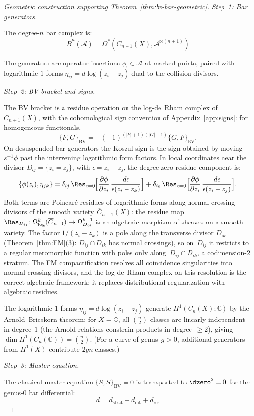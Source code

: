 \begin{proof}[Geometric construction supporting \textup{Theorem~\ref{thm:bv-bar-geometric}}]
\emph{Step~1: Bar generators.}

The degree-$n$ bar complex is:
\[\bar{B}^n(\mathcal{A}) = \Omega^*(\overline{C}_{n+1}(X), \mathcal{A}^{\boxtimes (n+1)})\]

The generators are operator insertions $\phi_i \in \mathcal{A}$ at marked points, paired with logarithmic $1$-forms $\eta_{ij} = d\log(z_i - z_j)$ dual to the collision divisors.

\emph{Step~2: BV bracket and signs.}

The BV bracket is a residue operation on the log-de~Rham complex
of~$\overline{C}_{n+1}(X)$, with the cohomological sign convention
of Appendix~\ref{app:signs}: for homogeneous functionals,
\[
\{F,G\}_{\mathrm{BV}}
=-(-1)^{(|F|+1)(|G|+1)}\{G,F\}_{\mathrm{BV}}.
\]
On desuspended bar generators the Koszul sign is the sign obtained by
moving $s^{-1}\phi$ past the intervening logarithmic form factors.
In local coordinates near the divisor
$D_{ij} = \{z_i = z_j\}$, with $\epsilon = z_i - z_j$, the
degree-zero residue component is:
\[\{\phi(z_i), \eta_{jk}\}
= \delta_{ij}\,\Res_{\epsilon = 0}
\Bigl[\frac{\partial\phi}{\partial z_i}\,
\frac{d\epsilon}{\epsilon(z_i - z_k)}\Bigr]
+ \delta_{ik}\,\Res_{\epsilon = 0}
\Bigl[\frac{\partial\phi}{\partial z_i}\,
\frac{d\epsilon}{\epsilon(z_i - z_j)}\Bigr].\]
Both terms are Poincar\'e residues of logarithmic forms along
normal-crossing divisors of the smooth
variety~$\overline{C}_{n+1}(X)$: the residue map
$\Res_{D_{ij}}\colon \Omega^k_{\log}(\overline{C}_{n+1})
\to \Omega^{k-1}_{D_{ij}}$ is an algebraic morphism of sheaves
on a smooth variety. The factor $1/(z_i - z_k)$ is a pole along
the transverse divisor $D_{ik}$ (Theorem~\ref{thm:FM}(3):
$D_{ij} \cap D_{ik}$ has normal crossings), so on~$D_{ij}$
it restricts to a regular meromorphic function with poles only
along~$D_{ij} \cap D_{ik}$, a codimension-$2$ stratum.
The FM compactification resolves all coincidence singularities
into normal-crossing divisors, and the log-de~Rham complex on
this resolution is the correct algebraic framework: it replaces
distributional regularization with algebraic residues.

The logarithmic $1$-forms $\eta_{ij} = d\log(z_i - z_j)$ generate
$H^1(C_n(X); \mathbb{C})$ by the Arnold--Brieskorn theorem;
for $X = \mathbb{C}$, all $\binom{n}{2}$ classes are linearly independent in degree~$1$
(the Arnold relations constrain products in degree~$\geq 2$), giving
$\dim H^1(C_n(\mathbb{C})) = \binom{n}{2}$. (For a curve of genus~$g > 0$, additional generators from $H^1(X)$ contribute $2gn$ classes.)

\emph{Step~3: Master equation.}

The classical master equation $\{S,S\}_{\mathrm{BV}}=0$ is transported
to $\dzero^2=0$ for the genus-$0$ bar differential:
\[d = d_{\text{strat}} + d_{\text{int}} + d_{\text{res}}\]
\end{proof}

